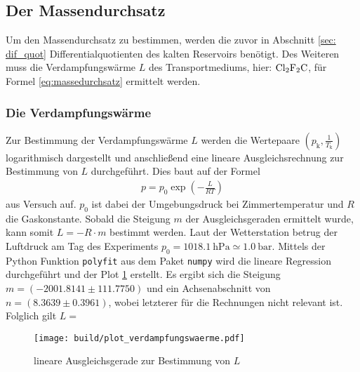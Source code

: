 \subsection[]{Der Massendurchsatz}
Um den Massendurchsatz zu bestimmen, werden die zuvor in Abschnitt \ref{sec: dif_quot} Differentialquotienten des kalten Reservoirs benötigt.
Des Weiteren muss die Verdampfungswärme $L$ des Transportmediums, hier: $\ce{Cl2F2C}$, für Formel \eqref{eq:massedurchsatz} ermittelt werden.


\subsubsection[]{Die Verdampfungswärme}
Zur Bestimmung der Verdampfungswärme $L$ werden die Wertepaare $\left(p_{\text{k}}, \frac{1}{T_{\text{k}}}\right)$ logarithmisch dargestellt
und anschließend eine lineare Ausgleichsrechnung zur Bestimmung von $L$ durchgeführt.
Dies baut auf der Formel 
\begin{align*}
    p = p_0 \exp{\left(-\frac{L}{RT}\right)}
\end{align*}
aus Versuch \cite[]{man:v203} auf.
$p_0$ ist dabei der Umgebungsdruck bei Zimmertemperatur und $R$ die Gaskonstante.
Sobald die Steigung $m$ der Ausgleichsgeraden ermittelt wurde, kann somit $L = -R \cdot m$ bestimmt werden.
Laut der Wetterstation \cite*[][]{wetterstation} betrug der Luftdruck am Tag des Experiments
$p_0 = \qty[]{1018.1}{\hecto\pascal} \simeq \qty[]{1.0}{\bar}$.
Mittels der Python \cite[]{python} Funktion \texttt{polyfit} aus dem Paket \texttt{numpy} \cite[]{numpy} wird die lineare Regression durchgeführt und
der Plot \ref{fig:ausgleichsgerade} erstellt.
Es ergibt sich die Steigung $m = \left(-2001.8141\pm 111.7750 \right)$ und ein Achsenabschnitt von $n = \left( 8.3639 \pm 0.3961 \right)$, 
wobei letzterer für die Rechnungen nicht relevant ist. 
Folglich gilt $L = $ %
\begin{figure}
    \texttt{[image: build/plot\_verdampfungswaerme.pdf]}
    \caption[]{lineare Ausgleichsgerade zur Bestimmung von $L$}
    \label{fig:ausgleichsgerade}
\end{figure}


